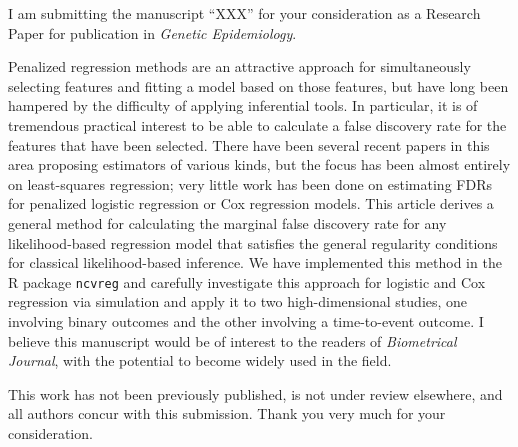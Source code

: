 \documentclass{uiletter}
\begin{document}

I am submitting the manuscript ``XXX'' for your consideration as a Research Paper for publication in {\em Genetic Epidemiology}.  

Penalized regression methods are an attractive approach for simultaneously selecting features and fitting a model based on those features, but have long been hampered by the difficulty of applying inferential tools.  In particular, it is of tremendous practical interest to be able to calculate a false discovery rate for the features that have been selected.  There have been several recent papers in this area proposing estimators of various kinds, but the focus has been almost entirely on least-squares regression; very little work has been done on estimating FDRs for penalized logistic regression or Cox regression models.  This article derives a general method for calculating the marginal false discovery rate for any likelihood-based regression model that satisfies the general regularity conditions for classical likelihood-based inference.  We have implemented this method in the R package {\tt ncvreg} and carefully investigate this approach for logistic and Cox regression via simulation and apply it to two high-dimensional studies, one involving binary outcomes and the other involving a time-to-event outcome.  I believe this manuscript would be of interest to the readers of {\em Biometrical Journal}, with the potential to become widely used in the field.

This work has not been previously published, is not under review elsewhere, and all authors concur with this submission.  Thank you very much for your consideration.

\EndLetter
\end{document}
